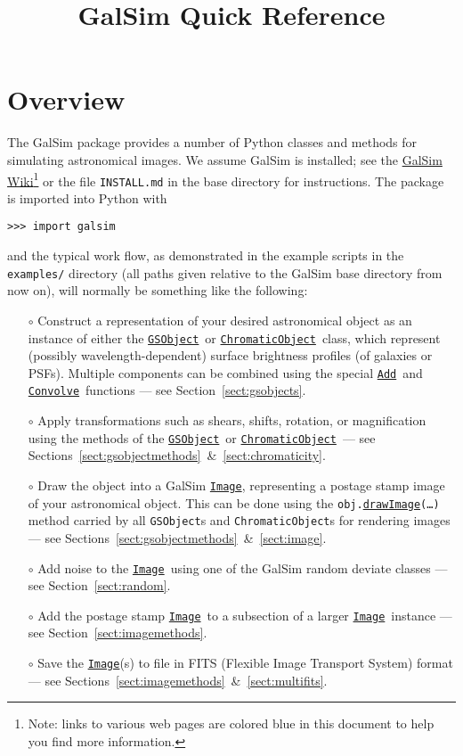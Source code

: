 \documentclass[preprint,10pt]{../../devel/modules/aastex}
\newcommand\GSObject{\href{http://galsim-developers.github.io/GalSim/classgalsim_1_1base_1_1_g_s_object.html}{\texttt{GSObject}}}
\newcommand\ChromaticObject{\href{http://galsim-developers.github.io/GalSim/classgalsim_1_1chromatic_1_1_chromatic_object.html}{\texttt{ChromaticObject}}}
\newcommand\drawImage{\href{http://galsim-developers.github.io/GalSim/classgalsim_1_1base_1_1_g_s_object.html\#aafe6ca9d84fe81543fbc105b897273db}{\texttt{drawImage}}}
\newcommand\Image{\href{http://galsim-developers.github.io/GalSim/classgalsim_1_1image_1_1_image.html}{\texttt{Image}}}
\newcommand\Add{\href{http://galsim-developers.github.io/GalSim/namespacegalsim_1_1compound.html\#ad3f305087db1b740376666d9c022d94e}{\texttt{Add}}}
\newcommand\Convolve{\href{http://galsim-developers.github.io/GalSim/namespacegalsim_1_1compound.html\#a17ccb8acb75a4eb6e35e791e4177957b}{\texttt{Convolve}}}
\begin{document}
\setlength{\parskip}{2.0ex plus 0.5ex minus 0.5ex}
\setlength{\parindent}{0cm}

\title{GalSim Quick Reference}

\tableofcontents

\newpage

\section{Overview}


The GalSim package provides a number of Python classes and methods for
simulating astronomical images.  We assume GalSim is installed; see the
\href{https://github.com/GalSim-developers/GalSim/wiki}{GalSim Wiki}\footnote{
Note: links to various web pages are colored blue in this document to help you find more 
information.} 
or the file \texttt{INSTALL.md} in the base directory
for instructions.  The package is imported into Python with

\texttt{>>> import galsim}

and the typical work flow, as demonstrated in the example scripts in the {\tt
examples/} directory (all paths given relative to
the GalSim base directory from now on), will normally
be something like the following:

\begin{itemize}

\item[$\circ$]
  Construct a representation of your desired astronomical object
  as an instance of either the \GSObject\ or \ChromaticObject\ class, which represent (possibly 
  wavelength-dependent) surface brightness profiles (of galaxies or PSFs).  Multiple components 
  can be
  combined using the special \Add\ and \Convolve\ functions --- see Section~\ref{sect:gsobjects}.
\item[$\circ$]
  Apply transformations such as shears, shifts, rotation, or magnification
  using the methods of the \GSObject\ or \ChromaticObject\ --- see
  Sections~\ref{sect:gsobjectmethods}~\&~\ref{sect:chromaticity}.
\item[$\circ$]
  Draw the object into a GalSim \Image, representing a postage
  stamp image of your astronomical object.  This can be done using the
  \texttt{obj.}\drawImage\texttt{(\dots)}
  method carried by all \texttt{GSObject}s and
  \texttt{ChromaticObject}s for rendering images --- see
  Sections~\ref{sect:gsobjectmethods}~\&~\ref{sect:image}.
\item[$\circ$]
  Add noise to the \Image\ using one of the GalSim
  random deviate classes --- see Section~\ref{sect:random}.
\item[$\circ$]
  Add the postage stamp \Image\ to a subsection of a larger
  \Image\ instance --- see Section~\ref{sect:imagemethods}.
\item[$\circ$]
  Save the \Image(s) to file in FITS (Flexible Image Transport
  System) format --- see Sections~\ref{sect:imagemethods}~\&~\ref{sect:multifits}.
\end{itemize}
\end{document}
